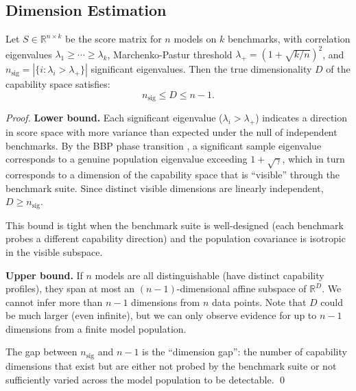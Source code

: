 
\subsection{Dimension Estimation}

\begin{theorem}
\label{thm:dim}
Let $S \in \mathbb{R}^{n \times k}$ be the score matrix for $n$ models on $k$ benchmarks, with correlation eigenvalues $\lambda_1 \geq \cdots \geq \lambda_k$, Marchenko-Pastur threshold $\lambda_+ = (1 + \sqrt{k/n})^2$, and $n_{\mathrm{sig}} = |\{i : \lambda_i > \lambda_+\}|$ significant eigenvalues. Then the true dimensionality $D$ of the capability space satisfies:
\[
  n_{\mathrm{sig}} \leq D \leq n - 1.
\]
\end{theorem}

\begin{proof}
\textbf{Lower bound.} Each significant eigenvalue ($\lambda_i > \lambda_+$) indicates a direction in score space with more variance than expected under the null of independent benchmarks. By the BBP phase transition \cite{baik2005phase}, a significant sample eigenvalue corresponds to a genuine population eigenvalue exceeding $1 + \sqrt{\gamma}$, which in turn corresponds to a dimension of the capability space that is ``visible'' through the benchmark suite. Since distinct visible dimensions are linearly independent, $D \geq n_{\mathrm{sig}}$.

This bound is tight when the benchmark suite is well-designed (each benchmark probes a different capability direction) and the population covariance is isotropic in the visible subspace.

\textbf{Upper bound.} If $n$ models are all distinguishable (have distinct capability profiles), they span at most an $(n-1)$-dimensional affine subspace of $\mathbb{R}^D$. We cannot infer more than $n - 1$ dimensions from $n$ data points. Note that $D$ could be much larger (even infinite), but we can only observe evidence for up to $n - 1$ dimensions from a finite model population.

The gap between $n_{\mathrm{sig}}$ and $n - 1$ is the ``dimension gap'': the number of capability dimensions that exist but are either not probed by the benchmark suite or not sufficiently varied across the model population to be detectable. \qed
\end{proof}

